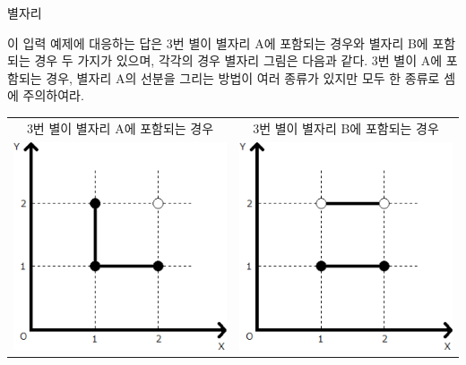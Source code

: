\begin{problem}{별자리}
	
	
	이 입력 예제에 대응하는 답은 3번 별이 별자리 A에 포함되는 경우와 별자리 B에 포함되는 경우 두 가지가 있으며, 각각의 경우 별자리 그림은 다음과 같다. 3번 별이 A에 포함되는 경우, 별자리 A의 선분을 그리는 방법이 여러 종류가 있지만 모두 한 종류로 셈에 주의하여라.
	
	\begin{center}
	\begin{tabular}{cc}	
		3번 별이 별자리 A에 포함되는 경우 & 3번 별이 별자리 B에 포함되는 경우 \\
		\includegraphics[width=0.4\linewidth]{img2.png} & 	\includegraphics[width=0.4\linewidth]{img3.png} \\
	\end{tabular}
	\end{center}


\end{problem}


